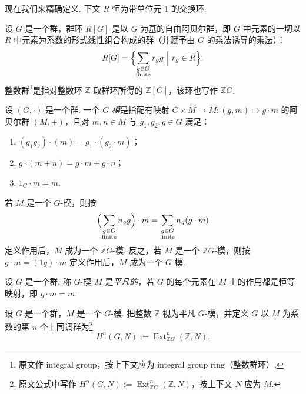 现在我们来精确定义. 下文 $R$ 恒为带单位元 $1$ 的交换环.

\begin{definition}\label{c4-def-4-1}
设 $G$ 是一个群，群环 $R[G]$ 是以 $G$ 为基的自由阿贝尔群，即 $G$ 中元素的一切以 $R$ 中元素为系数的形式线性组合构成的群（并赋予由 $G$ 的乘法诱导的乘法）：
\[
R[G]=\Bigl\{\sum_{\substack{g\in G\\ \text{finite}}}r_gg\ \Big|\ r_g\in R\Bigr\}.
\]
整数群\footnote{原文作 integral group，按上下文应为 integral group ring（整数群环）.}是指对整数环 $\mathbb Z$ 取群环所得的 $\mathbb Z[G]$，该环也写作 $\mathbb ZG$.
\end{definition}

\begin{definition}\label{c4-def-4-2}
设 $(G,\cdot)$ 是一个群. 一个 $G$-\emph{模}是指配有映射 $G\times M\to M:(g,m)\mapsto g\cdot m$ 的阿贝尔群 $(M,+)$，且对 $m,n\in M$ 与 $g_1,g_2,g\in G$ 满足：
\begin{enumerate}[label=(\arabic*),leftmargin=*]
    \item $(g_1g_2)\cdot(m)=g_1\cdot(g_2\cdot m)$；
    \item $g\cdot(m+n)=g\cdot m+g\cdot n$；
    \item $1_G\cdot m=m$.
\end{enumerate}
\end{definition}

\begin{remark}\label{c4-rem-4-3}
若 $M$ 是一个 $G$-模，则按
\[
\Bigl(\sum_{\substack{g\in G\\ \text{finite}}}n_gg\Bigr)\cdot m=\sum_{\substack{g\in G\\ \text{finite}}}n_g(g\cdot m)
\]
定义作用后，$M$ 成为一个 $\mathbb ZG$-模. 反之，若 $M$ 是一个 $\mathbb ZG$-模，则按 $g\cdot m=(1g)\cdot m$ 定义作用后，$M$ 成为一个 $G$-模.
\end{remark}

\begin{definition}\label{c4-def-4-4}
设 $G$ 是一个群. 称 $G$-模 $M$ 是\emph{平凡的}，若 $G$ 的每个元素在 $M$ 上的作用都是恒等映射，即 $g\cdot m=m$.
\end{definition}

\begin{definition}\label{c4-def-4-5}
设 $G$ 是一个群，$M$ 是一个 $G$-模. 把整数 $\mathbb Z$ 视为平凡 $G$-模，并定义 $G$ 以 $M$ 为系数的第 $n$ 个上同调群为\footnote{原文公式中写作 $H^n(G, N):=\operatorname{Ext}^n_{\mathbb ZG}(\mathbb Z, N)$，按上下文 $N$ 应为 $M$.}
\[
H^n(G, N):=\operatorname{Ext}^n_{\mathbb ZG}(\mathbb Z, N).
\]
\end{definition}

